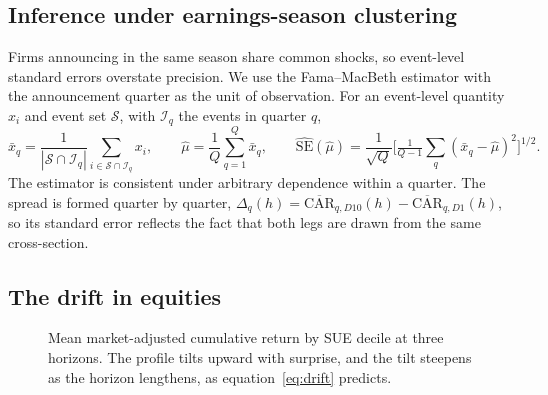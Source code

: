 \documentclass[11pt]{article}
\theoremstyle{definition}
\newcommand{\1}{\mathbf{1}}
\begin{document}
\subsection{Inference under earnings-season clustering}

Firms announcing in the same season share common shocks, so event-level standard errors
overstate precision. We use the Fama--MacBeth estimator \citep{FamaMacBeth1973} with the
announcement quarter as the unit of observation. For an event-level quantity $x_i$ and event
set $\mathcal S$, with $\mathcal I_q$ the events in quarter $q$,
\begin{equation}
  \bar x_q=\frac{1}{|\mathcal S\cap\mathcal I_q|}\sum_{i\in\mathcal S\cap\mathcal I_q}x_i,\qquad
  \hat\mu=\frac1Q\sum_{q=1}^{Q}\bar x_q,\qquad
  \widehat{\mathrm{SE}}(\hat\mu)=\frac{1}{\sqrt Q}\Big[\tfrac{1}{Q-1}\textstyle\sum_q(\bar x_q-\hat\mu)^2\Big]^{1/2}.
  \label{eq:fm}
\end{equation}
The estimator is consistent under arbitrary dependence within a quarter. The spread is formed
quarter by quarter, $\Delta_q(h)=\overline{\mathrm{CAR}}_{q,D10}(h)-\overline{\mathrm{CAR}}_{q,D1}(h)$,
so its standard error reflects the fact that both legs are drawn from the same cross-section.

\subsection{The drift in equities}

\begin{figure}[t]\centering
{}
\caption{Mean market-adjusted cumulative return by SUE decile at three horizons. The profile
tilts upward with surprise, and the tilt steepens as the horizon lengthens, as
equation~\eqref{eq:drift} predicts.}\label{fig:decile}
\end{figure}
\end{document}
